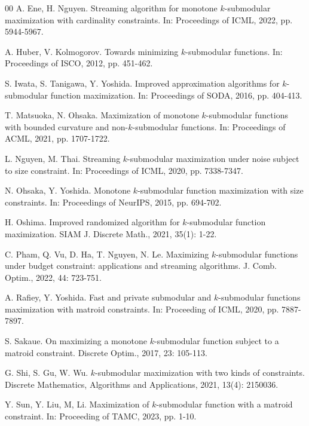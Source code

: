 \documentclass[preprint,12pt]{elsarticle}
\begin{document}
\begin{thebibliography}{00}
A. Ene, H. Nguyen.
Streaming algorithm for monotone $k$-submodular maximization with cardinality constraints.
In: Proceedings of ICML, 2022, pp. 5944-5967.

A. Huber, V. Kolmogorov.
Towards minimizing $k$-submodular functions.
In: Proceedings of ISCO, 2012, pp. 451-462.

S. Iwata, S. Tanigawa, Y. Yoshida.
Improved approximation algorithms for $k$-submodular function maximization.
In: Proceedings of SODA, 2016, pp. 404-413.


T. Matsuoka, N. Ohsaka.
Maximization of monotone $k$-submodular functions with bounded curvature and non-$k$-submodular functions.
In: Proceedings of ACML, 2021, pp. 1707-1722.


L. Nguyen, M. Thai.
Streaming $k$-submodular maximization under noise subject to size constraint.
In: Proceedings of ICML, 2020, pp. 7338-7347.


N. Ohsaka, Y. Yoshida.
Monotone $k$-submodular function maximization with size constraints.
In: Proceedings of NeurIPS, 2015, pp. 694-702.

H. Oshima.
Improved randomized algorithm for $k$-submodular function maximization.
SIAM J. Discrete Math., 2021, 35(1): 1-22.

C. Pham, Q. Vu, D. Ha, T. Nguyen, N. Le.
Maximizing $k$-submodular functions under budget constraint: applications and streaming algorithms.
J. Comb. Optim., 2022, 44: 723-751.

A. Rafiey, Y. Yoshida.
Fast and private submodular and $k$-submodular functions maximization with matroid constraints.
In: Proceeding of ICML, 2020, pp. 7887-7897.

S. Sakaue.
On maximizing a monotone $k$-submodular function subject to a matroid constraint.
Discrete Optim., 2017, 23: 105-113.

G. Shi, S. Gu, W. Wu.
$k$-submodular maximization with two kinds of constraints.
Discrete Mathematics, Algorithms and Applications, 2021, 13(4): 2150036.


Y. Sun, Y. Liu, M, Li.
Maximization of $k$-submodular function with a matroid constraint.
In: Proceeding of TAMC, 2023, pp. 1-10.


\end{thebibliography}
\end{document}
